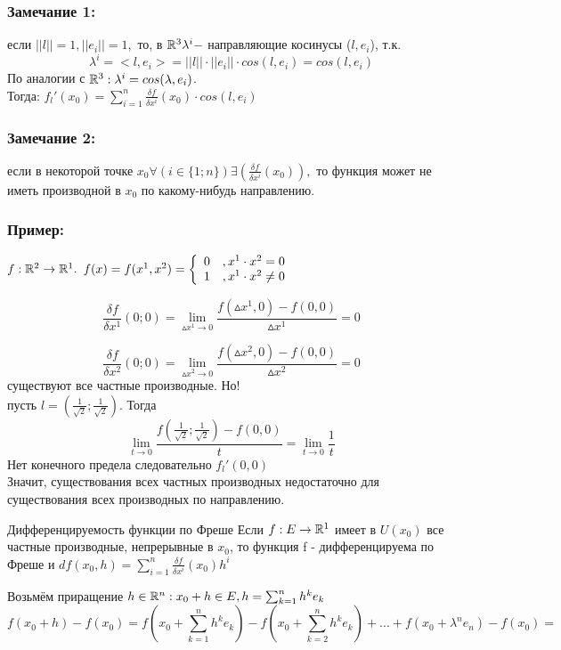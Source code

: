 \subsubsection{Замечание 1:}
если $||l||=1, ||e_i|| =1,$ то, в $\mathbb{R}^3 \lambda^i - $ направляющие косинусы ($l,e_i$), т.к.
$$
\lambda^i = <l, e_i> = ||l||\cdot ||e_i||\cdot cos(l,e_i) = cos (l, e_i)
$$
По аналогии с $\mathbb{R}^3: \lambda^i = cos(\lambda,e_i)$.
\\
Тогда: $f_l'(x_0) = \sum_{i=1}^{n}\frac{\delta f}{\delta x^i}(x_0)\cdot cos(l,e_i)$

\subsubsection{Замечание 2:}
если в некоторой точке $x_0 \forall(i\in\{1;n\})\exists(\frac{\delta f}{\delta x^i}(x_0)),$ то функция может не иметь производной в $x_0$ по какому-нибудь направлению.
\subsubsection{Пример:}
$f:\mathbb{R}^2\to\mathbb{R}^1.$ $f(x)=f(x^1,x^2)=\left\{\begin{array}{c c}
0 & ,x^1\cdot x^2 = 0 \\
1 & ,x^1\cdot x^2 \ne 0
\end{array}\right.$

$$
\frac{\delta f}{\delta x^1}(0;0) = \lim_{\vartriangle x^1\to 0}\frac{f(\vartriangle x^1,0)-f(0,0)}{\vartriangle x^1} = 0
$$

$$
\frac{\delta f}{\delta x^2}(0;0) = \lim_{\vartriangle x^2\to 0}\frac{f(\vartriangle x^2,0)-f(0,0)}{\vartriangle x^2} = 0
$$
существуют все частные производные. Но!
\\
пусть $l=(\frac{1}{\sqrt{2}};\frac{1}{\sqrt{2}})$. Тогда
$$
\lim_{t\to 0}\frac{f(\frac{1}{\sqrt{2}};\frac{1}{\sqrt{2}}) - f(0,0)}{t}= \lim_{t\to 0} \frac{1}{t}
$$
Нет конечного предела следовательно $f_l'(0,0)$
\\
Значит, существования всех частных производных недостаточно для существования всех производных по направлению.

\begin{teorema}
Дифференцируемость функции по Фреше
Если $f:E\to\mathbb{R}^1$ имеет в $U(x_0)$ все частные производные, непрерывные в $x_0$, то функция f - дифференцируема по Фреше и $df(x_0,h)=\sum_{i=1}^{n}\frac{\delta f}{\delta x^i}(x_0)h^i$
\end{teorema}
\dokvo
Возьмём приращение $h\in\mathbb{R}^n:x_0+h\in E, h =\sum_{k=1}^{n}h^k e_k$
\\
$$f(x_0+h)-f(x_0) = f(x_0+\sum_{k=1}^{n}h^k e_k) - f(x_0+\sum_{k=2}^{n}h^k e_k)+...+f(x_0+\lambda^n e_n) - f(x_0)=$$

